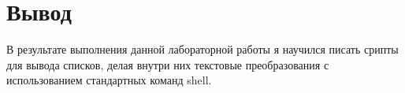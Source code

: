 \section{Вывод}
В результате выполнения данной лабораторной работы я научился писать срипты для вывода списков, делая внутри них текстовые преобразования с использованием стандартных команд shell.
